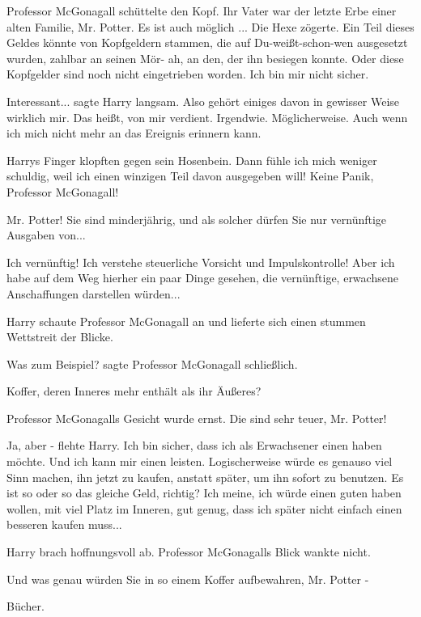 Professor McGonagall schüttelte den Kopf. \glqq Ihr Vater war der letzte Erbe einer alten
Familie, Mr. Potter. Es ist auch möglich ...\grqq{}
Die Hexe zögerte. \glqq Ein Teil dieses Geldes könnte von
Kopfgeldern stammen, die auf Du-weißt-schon-wen ausgesetzt wurden, zahlbar an seinen Mör- ah, an den, der ihn besiegen
konnte. Oder diese Kopfgelder sind noch nicht eingetrieben worden. Ich bin mir nicht sicher.\grqq{}

\glqq Interessant...\grqq{} sagte Harry langsam. \glqq Also gehört einiges davon in gewisser Weise wirklich
mir. Das heißt, von mir verdient. Irgendwie. Möglicherweise. Auch wenn ich mich nicht mehr an das Ereignis erinnern
kann.\grqq{}

Harrys Finger klopften gegen sein Hosenbein. \glqq Dann fühle ich mich weniger schuldig, weil
ich einen winzigen Teil davon ausgegeben will!
Keine Panik, Professor McGonagall!\grqq{}

\glqq Mr.
Potter! Sie sind minderjährig, und als solcher dürfen Sie nur vernünftige Ausgaben von...\grqq{}

\glqq Ich
vernünftig! Ich verstehe steuerliche Vorsicht und Impulskontrolle! Aber ich habe auf dem Weg hierher ein paar Dinge
gesehen, die vernünftige, erwachsene Anschaffungen darstellen würden...\grqq{}

Harry schaute Professor
McGonagall an und lieferte sich einen stummen Wettstreit der Blicke.

\glqq Was zum Beispiel?\grqq{} sagte
Professor McGonagall schließlich.

\glqq Koffer, deren Inneres mehr enthält als ihr
Äußeres?\grqq{}

Professor McGonagalls Gesicht wurde ernst. \glqq Die sind sehr teuer, Mr. Potter!\grqq{}

\glqq Ja, aber -\grqq{} flehte Harry. \glqq Ich bin sicher, dass ich als Erwachsener einen haben möchte. Und
ich kann mir einen leisten. Logischerweise würde es genauso viel Sinn machen, ihn jetzt zu kaufen, anstatt später, um
ihn sofort zu benutzen. Es ist so oder so das gleiche Geld, richtig? Ich meine, ich würde einen guten haben wollen, mit
viel Platz im Inneren, gut genug, dass ich später nicht einfach einen besseren kaufen muss...\grqq{}

Harry
brach hoffnungsvoll ab. Professor McGonagalls Blick wankte nicht.

\glqq Und was genau würden Sie in so einem
Koffer aufbewahren, Mr. Potter -\grqq{}

\glqq Bücher.\grqq{}

